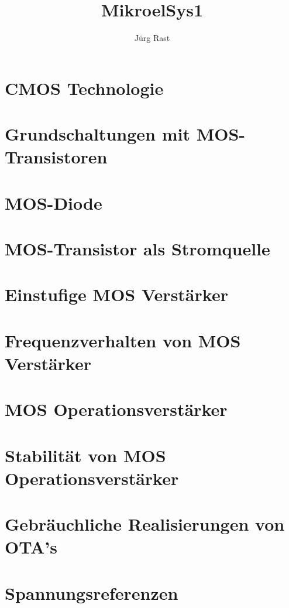 \documentclass[titlepage=true]{scrartcl}
\title{MikroelSys1}
\author{Jürg Rast}
\begin{document}
\begin{titlepage}
	\thispagestyle{empty}
	\maketitle
\end{titlepage}

\tableofcontents
\newpage

\section{CMOS Technologie}





\section{Grundschaltungen mit MOS-Transistoren}

\section{MOS-Diode}

\section{MOS-Transistor als Stromquelle}



\section{Einstufige MOS Verstärker}

\section{Frequenzverhalten von MOS Verstärker}

\section{MOS Operationsverstärker}

\section{Stabilität von MOS Operationsverstärker}

\section{Gebräuchliche Realisierungen von OTA's}

\section{Spannungsreferenzen}
\end{document}
